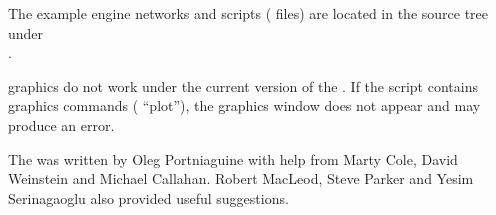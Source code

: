 The example \m{} engine networks and scripts ( files)
are located in the \sr{} source tree under\\
.


\m{} graphics do not work under the current version of the \mlm{}.  If the
script contains graphics commands (\eg{} ``plot''), the \m{} graphics
window does not appear and may produce an error.

\ModuleRefCredits

The \mlm{} was written by Oleg Portniaguine with help from Marty Cole,
David Weinstein and Michael Callahan.  Robert MacLeod, Steve Parker and
Yesim Serinagaoglu also provided useful suggestions.

